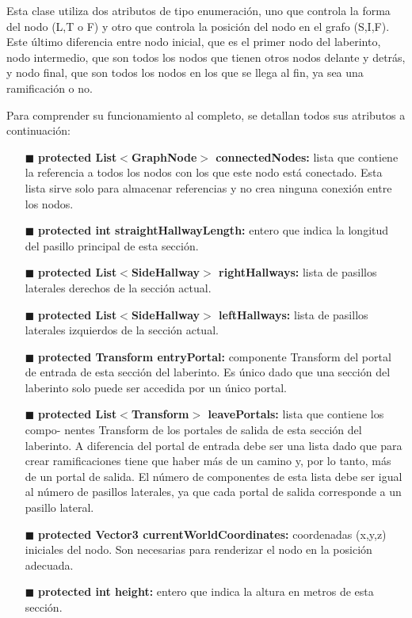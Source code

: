 \documentclass[../main.tex]{subfiles}
\begin{document}
Esta clase utiliza dos atributos de tipo enumeración, uno que controla la forma del nodo (L,T o F) y otro que controla la posición del nodo en el grafo (S,I,F). Este último diferencia entre nodo inicial, que es el primer nodo del laberinto, nodo intermedio, que son todos los nodos que tienen otros nodos delante y detrás, y nodo final, que son todos los nodos en los que se llega al fin, ya sea una ramificación o no.

Para comprender su funcionamiento al completo, se detallan todos sus atributos a continuación:

\begin{itemize}
    \item[$\blacksquare$] \textbf{protected List$<$GraphNode$>$ connectedNodes:} lista que contiene la referencia a todos los nodos con los que este nodo está conectado. Esta lista sirve solo para almacenar referencias y no crea ninguna conexión entre los nodos.
    \item[$\blacksquare$] \textbf{protected int straightHallwayLength:} entero que indica la longitud del pasillo principal de esta sección.
    \item[$\blacksquare$] \textbf{protected List$<$SideHallway$>$ rightHallways:} lista de pasillos laterales derechos de la sección actual.
    \item[$\blacksquare$] \textbf{protected List$<$SideHallway$>$ leftHallways:} lista de pasillos laterales izquierdos de la sección actual.
    \item[$\blacksquare$] \textbf{protected Transform entryPortal:} componente Transform del portal de entrada de esta sección del laberinto. Es único dado que una sección del laberinto solo puede ser accedida por un único portal.
    \item[$\blacksquare$] \textbf{protected List$<$Transform$>$ leavePortals:} lista que contiene los compo- nentes Transform de los portales de salida de esta sección del laberinto. A diferencia del portal de entrada debe ser una lista dado que para crear ramificaciones tiene que haber más de un camino y, por lo tanto, más de un portal de salida. El número de componentes de esta lista debe ser igual al número de pasillos laterales, ya que cada portal de salida corresponde a un pasillo lateral.
    \item[$\blacksquare$] \textbf{protected Vector3 currentWorldCoordinates:} coordenadas (x,y,z) iniciales del nodo. Son necesarias para renderizar el nodo en la posición adecuada.
    \item[$\blacksquare$] \textbf{protected int height:} entero que indica la altura en metros de esta sección.

\end{itemize}
\end{document}
